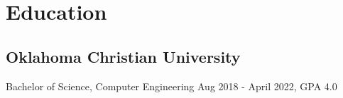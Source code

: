 \documentclass{article}
\begin{document}
\section{Education}
	\subsection{Oklahoma Christian University}
		Bachelor of Science, Computer Engineering Aug 2018 - April 2022, GPA 4.0
\begin{comment}
		\subsection{Spring 2022}
			\begin{itemize}
				\item ELEC-3523 Digital Signal Processing
				\item CENG-4303 HDL Design of Microprocessors
				\item CENG-4753 Systems Design III
			\end{itemize}
		\subsection{Fall 2021}
			\begin{itemize}
				\item ELEC-4523 Software Engineering of Real-Time Systems
				\item CENG-4113 Software and Network Engineering
				\item CENG-4743 Systems Design II
			\end{itemize}
		\subsection{Spring 2021}
			\begin{itemize}
				\item CENG-3213 Computer Systems
				\item CENG-4223 Embedded Systems Design
				\item CENG-4213 Network Engineering
				\item ELEC-3313 Electronic Devices
				\item CMSC-4413 Operating Systems
				\item CENG-4732 Systems Design I
			\end{itemize}
		\subsection{Fall 2020}
			\begin{itemize}
				\item CENG-3203 Intro to Microprocessors
				\item ELEC-3504 Signals and Systems
				\item ELEC-3303 Analog Electronics
			\end{itemize}

\end{comment}
\end{document}
